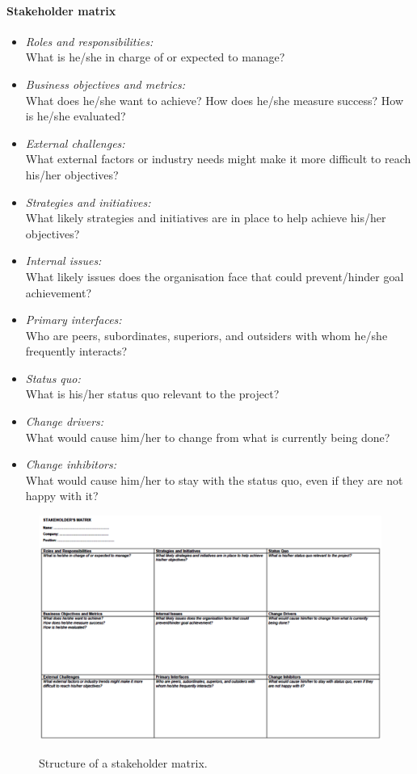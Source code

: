 \documentclass[a4paper, landscape, 6pt, fleqn]{scrartcl}
\begin{document}
\begin{multicols*}{4}
\paragraph{Stakeholder matrix}

\begin{itemize}
\item \textit{Roles and responsibilities:} \\
What is he/she in charge of or expected to manage?
\item \textit{Business objectives and metrics:} \\
What does he/she want to achieve? How does he/she measure success? How is he/she evaluated?
\item \textit{External challenges:} \\
What external factors or industry needs might make it more difficult to reach his/her objectives?
\item \textit{Strategies and initiatives:} \\
What likely strategies and initiatives are in place to help achieve his/her objectives?
\item \textit{Internal issues:} \\
What likely issues does the organisation face that could prevent/hinder goal achievement?
\item \textit{Primary interfaces:} \\
Who are peers, subordinates, superiors, and outsiders with whom he/she frequently interacts?
\item \textit{Status quo:} \\
What is his/her status quo relevant to the project?
\item \textit{Change drivers:} \\
What would cause him/her to change from what is currently being done?
\item \textit{Change inhibitors:} \\
What would cause him/her to stay with the status quo, even if they are not happy with it?
\end{itemize}

\begin{figure}[H]
\centering
\includegraphics[width=1.05 \linewidth]{StakeholderMatrix}
\label{fig:StakeholderMatrix}
\caption{Structure of a stakeholder matrix.}
\end{figure}


\end{multicols*}
\end{document}
